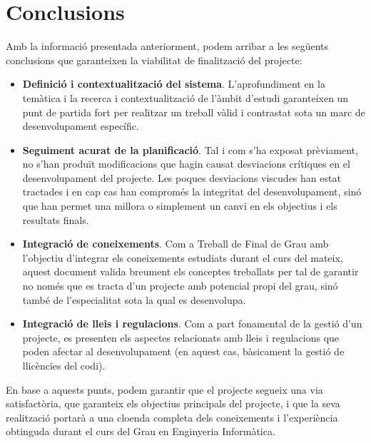 
\chapter{Conclusions} %

\label{Conclusions} %

Amb la informació presentada anteriorment, podem arribar a les següents conclusions que garanteixen la viabilitat de finalització del projecte:

\begin{itemize}
\item \textbf{Definició i contextualització del sistema}. L'aprofundiment en la temàtica i la recerca i contextualització de l'àmbit d'estudi garanteixen un punt de partida fort per realitzar un treball vàlid i contrastat sota un marc de desenvolupament específic.
\item \textbf{Seguiment acurat de la planificació}. Tal i com s'ha exposat prèviament, no s'han produït modificacions que hagin causat desviacions crítiques en el desenvolupament del projecte. Les poques desviacions viscudes han estat tractades i en cap cas han compromés la integritat del desenvolupament, sinó que han permet una millora o simplement un canvi en els objectius i els resultats finals.
\item \textbf{Integració de coneixements}. Com a Treball de Final de Grau amb l'objectiu d'integrar els coneixements estudiats durant el curs del mateix, aquest document valida breument els conceptes treballats per tal de garantir no només que es tracta d'un projecte amb potencial propi del grau, sinó també de l'especialitat sota la qual es desenvolupa.
\item \textbf{Integració de lleis i regulacions}. Com a part fonamental de la gestió d'un projecte, es presenten els aspectes relacionats amb lleis i regulacions que poden afectar al desenvolupament (en aquest cas, bàsicament la gestió de llicències del codi).
\end{itemize}

En base a aquests punts, podem garantir que el projecte segueix una via satisfactòria, que garanteix els objectius principals del projecte, i que la seva realització portarà a una cloenda completa dels coneixements i l'experiència obtinguda durant el curs del Grau en Enginyeria Informàtica.